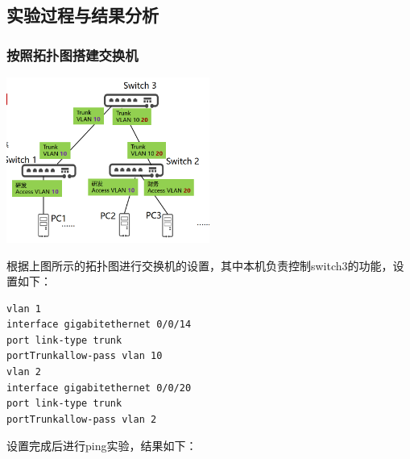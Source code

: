 \documentclass{article}
\begin{document}
\subsection{实验过程与结果分析}
\subsubsection{按照拓扑图搭建交换机}
\vspace{10pt}
\centerline{\includegraphics[width=0.5\textwidth]{2_5_images/1.png}}
\vspace{10pt}
根据上图所示的拓扑图进行交换机的设置，其中本机负责控制switch3的功能，设置如下：
\begin{lstlisting}
vlan 1
interface gigabitethernet 0/0/14
port link-type trunk
portTrunkallow-pass vlan 10
vlan 2
interface gigabitethernet 0/0/20
port link-type trunk
portTrunkallow-pass vlan 2
\end{lstlisting}
设置完成后进行ping实验，结果如下：
\end{document}

